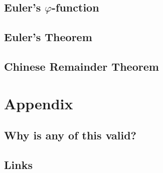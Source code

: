 \documentclass{article}
\begin{document}
\subsection{Euler's $\varphi$-function}

\subsection{Euler's Theorem}

\subsection{Chinese Remainder Theorem}

\section{}

\section{Appendix}

\subsection{Why is any of this valid?}

\subsection{Links}
\end{document}
